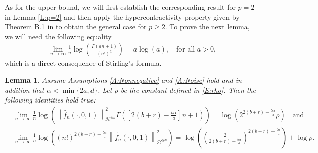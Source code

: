 \documentclass[12pt]{report}
\theoremstyle{plain}
\newtheorem{lemma}[theorem]{Lemma}
\theoremstyle{definition}
\numberwithin{equation}{section}
\newcommand{\Norm}[1]{\left\|  #1   \right\|}
\begin{document}
As for the upper bound, we will first establish the corresponding result for $p=2$ in Lemma
\ref{L:p=2} and then apply the hypercontractivity property given by Theorem B.1 in \cite{balan.chen.ea:22:exact} to
obtain the general case for $p\ge 2$. To prove the next lemma, we will need the following equality
\begin{align} \label{E:Stirling}
\lim_{n \to \infty} \frac{1}{n}\log\left( \frac{\Gamma(an+1)}{(n!)^a} \right) = a \log(a), \quad
\text{for all $a>0$,}
\end{align}
which is a direct consequence of Stirling's formula.

\begin{lemma} \label{L:2ineq}
	Assume Assumptions \ref{A:Nonnegative} and \ref{A:Noise} hold and in addition that $\alpha <
	\min\{2a,d\}$. Let $\rho$ be the constant defined in \eqref{E:rho}. Then the following identities
	hold true:\\
	\begin{align} \label{E:2ineq-a}
	&\lim_{n \to \infty}  \frac{1}{n} \log \left( \Norm{ \widetilde{f_n}(\cdot,0,1) }_{ \mathcal{H}^{\otimes n} }^2 \Gamma\left( \left[ 2(b+r)- \frac{b \alpha}{a} \right] n +1 \right) \right)
	= \log\left(2^{2(b+r)-\frac{b\alpha}{a}}\rho\right) \quad \text{and}\\
	\label{E:2ineq-b}
	& \lim_{n \to \infty}  \frac{1}{n} \log \left( (n!)^{2(b+r)- \frac{b \alpha}{a} }\Norm{ \widetilde{f_n}(\cdot,0,1) }_{ \mathcal{H}^{\otimes n} }^2  \right)
	=  \log\left( \left(\frac{2}{2(b+r)-\frac{b\alpha}{a}}\right)^{2(b+r)-\frac{b\alpha}{a}}\right) + \log\rho.
	\end{align}
\end{lemma}
\end{document}

